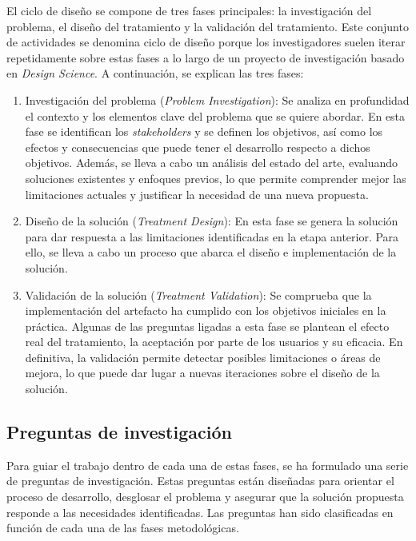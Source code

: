El ciclo de diseño se compone de tres fases principales: la investigación del problema, el diseño del tratamiento y la validación del tratamiento. Este conjunto de actividades se denomina ciclo de diseño porque los investigadores suelen iterar repetidamente sobre estas fases a lo largo de un proyecto de investigación basado en \textit{Design Science}.  A continuación, se explican las tres fases:
\begin{enumerate}
    \item Investigación del problema (\textit{Problem Investigation}): Se analiza en profundidad el contexto y los elementos clave del problema que se quiere abordar. En esta fase se identifican los \textit{stakeholders} y se definen los objetivos, así como los efectos y consecuencias que puede tener el desarrollo respecto a dichos objetivos. Además, se lleva a cabo un análisis del estado del arte, evaluando soluciones existentes y enfoques previos, lo que permite comprender mejor las limitaciones actuales y justificar la necesidad de una nueva propuesta.
    
    \item Diseño de la solución (\textit{Treatment Design}): En esta fase se genera la solución para dar respuesta a las limitaciones identificadas en la etapa anterior. Para ello, se lleva a cabo un proceso que abarca el diseño e implementación de la solución.
     
    \item Validación de la solución (\textit{Treatment Validation}): Se comprueba que la implementación del artefacto ha cumplido con los objetivos iniciales en la práctica. Algunas de las preguntas ligadas a esta fase se plantean el efecto real del tratamiento, la aceptación por parte de los usuarios y su eficacia. En definitiva, la validación permite detectar posibles limitaciones o áreas de mejora, lo que puede dar lugar a nuevas iteraciones sobre el diseño de la solución. 
\end{enumerate}

\subsection{Preguntas de investigación}
Para guiar el trabajo dentro de cada una de estas fases, se ha formulado una serie de preguntas de investigación. Estas preguntas están diseñadas para orientar el proceso de desarrollo, desglosar el problema y asegurar que la solución propuesta responde a las necesidades identificadas. 
Las preguntas han sido clasificadas en función de cada una de las fases metodológicas.


